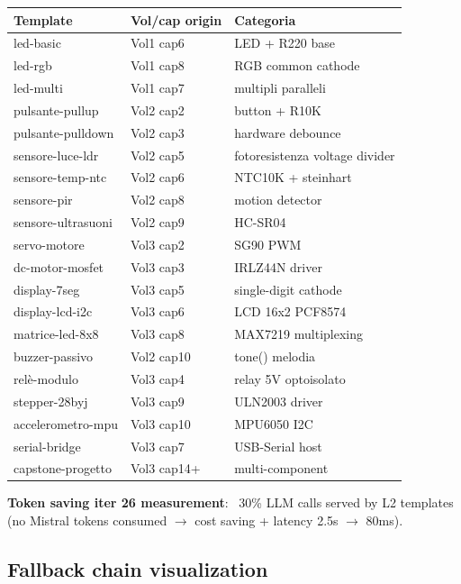 \documentclass[12pt,a4paper]{article}
\begin{document}
\begin{center}
\begin{small}
\begin{tabular}{l l l}
\toprule
\textbf{Template} & \textbf{Vol/cap origin} & \textbf{Categoria} \\
\midrule
led-basic & Vol1 cap6 & LED + R220 base \\
led-rgb & Vol1 cap8 & RGB common cathode \\
led-multi & Vol1 cap7 & multipli paralleli \\
pulsante-pullup & Vol2 cap2 & button + R10K \\
pulsante-pulldown & Vol2 cap3 & hardware debounce \\
sensore-luce-ldr & Vol2 cap5 & fotoresistenza voltage divider \\
sensore-temp-ntc & Vol2 cap6 & NTC10K + steinhart \\
sensore-pir & Vol2 cap8 & motion detector \\
sensore-ultrasuoni & Vol2 cap9 & HC-SR04 \\
servo-motore & Vol3 cap2 & SG90 PWM \\
dc-motor-mosfet & Vol3 cap3 & IRLZ44N driver \\
display-7seg & Vol3 cap5 & single-digit cathode \\
display-lcd-i2c & Vol3 cap6 & LCD 16x2 PCF8574 \\
matrice-led-8x8 & Vol3 cap8 & MAX7219 multiplexing \\
buzzer-passivo & Vol2 cap10 & tone() melodia \\
relè-modulo & Vol3 cap4 & relay 5V optoisolato \\
stepper-28byj & Vol3 cap9 & ULN2003 driver \\
accelerometro-mpu & Vol3 cap10 & MPU6050 I2C \\
serial-bridge & Vol3 cap7 & USB-Serial host \\
capstone-progetto & Vol3 cap14+ & multi-component \\
\bottomrule
\end{tabular}
\end{small}
\end{center}

\textbf{Token saving iter 26 measurement}: ~30\% LLM calls served by L2 templates (no Mistral tokens consumed $\rightarrow$ cost saving + latency 2.5s $\rightarrow$ 80ms).

\subsection{Fallback chain visualization}
\end{document}
